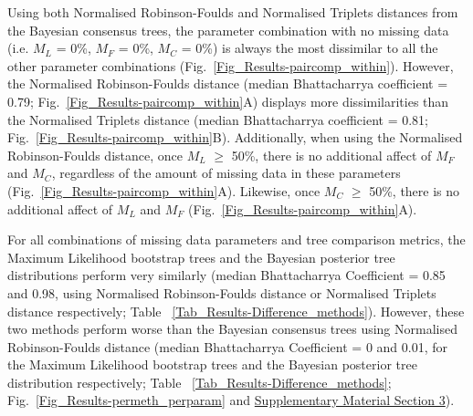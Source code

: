 \documentclass[12pt,letterpaper]{article}
\begin{document}
Using both Normalised Robinson-Foulds and Normalised Triplets distances from the Bayesian consensus trees, the parameter combination with no missing data (i.e. $M_{L}$ = 0\%, $M_{F}$ = 0\%, $M_{C}$ = 0\%) is always the most dissimilar to all the other parameter combinations (Fig.~\ref{Fig_Results-paircomp_within}). However, the Normalised Robinson-Foulds distance (median Bhattacharrya coefficient = 0.79; Fig.~\ref{Fig_Results-paircomp_within}A) displays more dissimilarities than the Normalised Triplets distance (median Bhattacharrya coefficient = 0.81; Fig.~\ref{Fig_Results-paircomp_within}B). Additionally, when using the Normalised Robinson-Foulds distance, once $M_{L}$ $\geq$  50\%, there is no additional affect of $M_{F}$ and $M_{C}$, regardless of the amount of missing data in these parameters (Fig.~\ref{Fig_Results-paircomp_within}A). Likewise, once $M_{C}$ $\geq$ 50\%, there is no additional affect of $M_{L}$ and $M_{F}$ (Fig.~\ref{Fig_Results-paircomp_within}A).

For all combinations of missing data parameters and tree comparison metrics, the Maximum Likelihood bootstrap trees and the Bayesian posterior tree distributions perform very similarly (median Bhattacharrya Coefficient = 0.85 and 0.98, using Normalised Robinson-Foulds distance or Normalised Triplets distance respectively; Table ~\ref{Tab_Results-Difference_methods}). However, these two methods perform worse than the Bayesian consensus trees using Normalised Robinson-Foulds distance (median Bhattacharrya Coefficient = 0 and 0.01, for the Maximum Likelihood bootstrap trees and the Bayesian posterior tree distribution respectively; Table ~\ref{Tab_Results-Difference_methods}; Fig.~\ref{Fig_Results-permeth_perparam} and \hyperref[SupplementaryMaterial]{Supplementary Material Section 3}).
\end{document}
